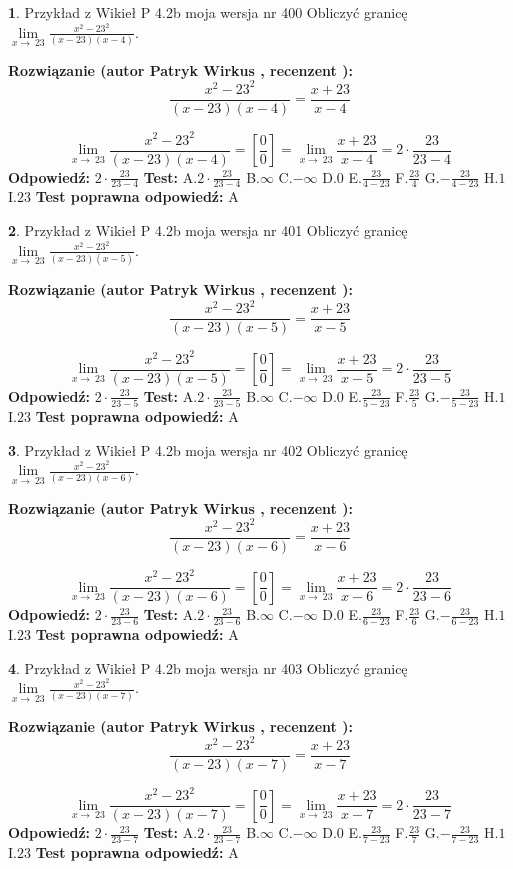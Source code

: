 \documentclass[12pt, a4paper]{article}
\theoremstyle{definition} %
\newtheorem{zad}{}
\newcommand{\zadStart}[1]{\begin{zad}#1\newline}
\newcommand{\zadStop}{\end{zad}}
\newcommand{\rozwStart}[2]{\noindent \textbf{Rozwiązanie (autor #1 , recenzent #2): }\newline}
\newcommand{\rozwStop}{\newline}
\newcommand{\odpStart}{\noindent \textbf{Odpowiedź:}\newline}
\newcommand{\odpStop}{\newline}
\newcommand{\testStart}{\noindent \textbf{Test:}\newline}
\newcommand{\testStop}{\newline}
\newcommand{\kluczStart}{\noindent \textbf{Test poprawna odpowiedź:}\newline}
\newcommand{\kluczStop}{\newline}
\begin{document}
\zadStart{Przykład z Wikieł P 4.2b moja wersja nr 400}
Obliczyć granicę $\lim\limits_{x\to\ 23}\frac{x^{2}-23^{2}}{(x-23)(x-4)}$.
\zadStop
\rozwStart{Patryk Wirkus}{}
$$\frac{x^{2}-23^{2}}{(x-23)(x-4)}=\frac{x+23}{x-4}$$

$$\lim\limits_{x\to\ 23}\frac{x^{2}-23^{2}}{(x-23)(x-4)}=[\frac{0}{0}]=\lim\limits_{x\to\ 23}\frac{x+23}{x-4}=2 \cdot \frac{23}{23-4}$$
\rozwStop
\odpStart
$2 \cdot \frac{23}{23-4}$
\odpStop
\testStart
A.$2 \cdot \frac{23}{23-4}$
B.$\infty$
C.$-\infty$
D.$0$
E.$\frac{23}{4-23}$
F.$\frac{23}{4}$
G.$-\frac{23}{4-23}$
H.$1$
I.$23$
\testStop
\kluczStart
A
\kluczStop



\zadStart{Przykład z Wikieł P 4.2b moja wersja nr 401}
Obliczyć granicę $\lim\limits_{x\to\ 23}\frac{x^{2}-23^{2}}{(x-23)(x-5)}$.
\zadStop
\rozwStart{Patryk Wirkus}{}
$$\frac{x^{2}-23^{2}}{(x-23)(x-5)}=\frac{x+23}{x-5}$$

$$\lim\limits_{x\to\ 23}\frac{x^{2}-23^{2}}{(x-23)(x-5)}=[\frac{0}{0}]=\lim\limits_{x\to\ 23}\frac{x+23}{x-5}=2 \cdot \frac{23}{23-5}$$
\rozwStop
\odpStart
$2 \cdot \frac{23}{23-5}$
\odpStop
\testStart
A.$2 \cdot \frac{23}{23-5}$
B.$\infty$
C.$-\infty$
D.$0$
E.$\frac{23}{5-23}$
F.$\frac{23}{5}$
G.$-\frac{23}{5-23}$
H.$1$
I.$23$
\testStop
\kluczStart
A
\kluczStop



\zadStart{Przykład z Wikieł P 4.2b moja wersja nr 402}
Obliczyć granicę $\lim\limits_{x\to\ 23}\frac{x^{2}-23^{2}}{(x-23)(x-6)}$.
\zadStop
\rozwStart{Patryk Wirkus}{}
$$\frac{x^{2}-23^{2}}{(x-23)(x-6)}=\frac{x+23}{x-6}$$

$$\lim\limits_{x\to\ 23}\frac{x^{2}-23^{2}}{(x-23)(x-6)}=[\frac{0}{0}]=\lim\limits_{x\to\ 23}\frac{x+23}{x-6}=2 \cdot \frac{23}{23-6}$$
\rozwStop
\odpStart
$2 \cdot \frac{23}{23-6}$
\odpStop
\testStart
A.$2 \cdot \frac{23}{23-6}$
B.$\infty$
C.$-\infty$
D.$0$
E.$\frac{23}{6-23}$
F.$\frac{23}{6}$
G.$-\frac{23}{6-23}$
H.$1$
I.$23$
\testStop
\kluczStart
A
\kluczStop



\zadStart{Przykład z Wikieł P 4.2b moja wersja nr 403}
Obliczyć granicę $\lim\limits_{x\to\ 23}\frac{x^{2}-23^{2}}{(x-23)(x-7)}$.
\zadStop
\rozwStart{Patryk Wirkus}{}
$$\frac{x^{2}-23^{2}}{(x-23)(x-7)}=\frac{x+23}{x-7}$$

$$\lim\limits_{x\to\ 23}\frac{x^{2}-23^{2}}{(x-23)(x-7)}=[\frac{0}{0}]=\lim\limits_{x\to\ 23}\frac{x+23}{x-7}=2 \cdot \frac{23}{23-7}$$
\rozwStop
\odpStart
$2 \cdot \frac{23}{23-7}$
\odpStop
\testStart
A.$2 \cdot \frac{23}{23-7}$
B.$\infty$
C.$-\infty$
D.$0$
E.$\frac{23}{7-23}$
F.$\frac{23}{7}$
G.$-\frac{23}{7-23}$
H.$1$
I.$23$
\testStop
\kluczStart
A
\kluczStop
\end{document}
